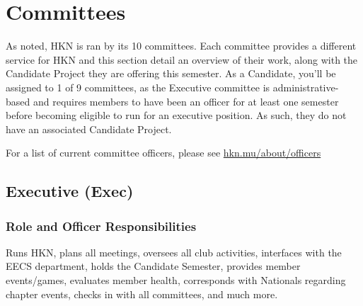 \documentclass[11pt, article, oneside]{memoir}
\begin{document}

    \newpage
    \chapter{Committees}

    As noted, HKN is ran by its 10 committees. Each committee provides a different service for HKN and this section detail an overview of their work, along with the Candidate Project they are offering this semester. As a Candidate, you'll be assigned to 1 of 9 committees, as the Executive committee is administrative-based and requires members to have been an officer for at least one semester before becoming eligible to run for an executive position. As such, they do not have an associated Candidate Project.

    \bigbreak

    For a list of current committee officers, please see \href{https://hkn.mu/about/officers}{hkn.mu/about/officers}

    \section{Executive (Exec)}
    \subsection{Role and Officer Responsibilities}
        Runs HKN, plans all meetings, oversees all club activities, interfaces with the EECS department, holds the Candidate Semester, provides member events/games, evaluates member health, corresponds with Nationals regarding chapter events, checks in with all committees, and much more. 
\end{document}
